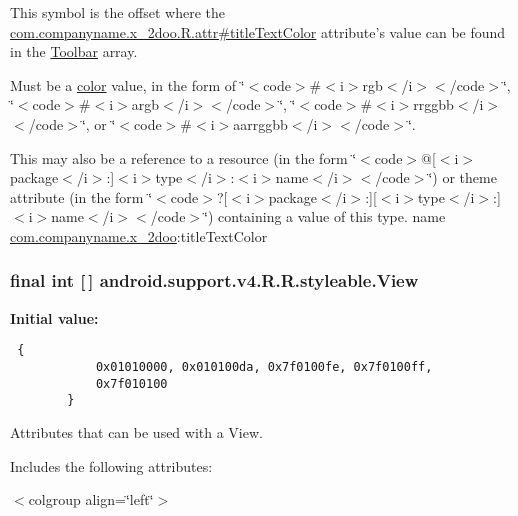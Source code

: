 This symbol is the offset where the \hyperlink{classcom_1_1companyname_1_1x__2doo_1_1_r_1_1attr_82d4d30477ffe7011f23274c9ec965a5}{com.companyname.x\_\-2doo.R.attr\#titleTextColor} attribute's value can be found in the \hyperlink{classandroid_1_1support_1_1v4_1_1_r_1_1styleable_0646d71cfbd4a8645c7d805b33e1c574}{Toolbar} array.

Must be a \hyperlink{classandroid_1_1support_1_1v4_1_1_r_1_1color}{color} value, in the form of \char`\"{}$<$code$>$\#$<$i$>$rgb$<$/i$>$$<$/code$>$\char`\"{}, \char`\"{}$<$code$>$\#$<$i$>$argb$<$/i$>$$<$/code$>$\char`\"{}, \char`\"{}$<$code$>$\#$<$i$>$rrggbb$<$/i$>$$<$/code$>$\char`\"{}, or \char`\"{}$<$code$>$\#$<$i$>$aarrggbb$<$/i$>$$<$/code$>$\char`\"{}. 

This may also be a reference to a resource (in the form \char`\"{}$<$code$>$@\mbox{[}$<$i$>$package$<$/i$>$:\mbox{]}$<$i$>$type$<$/i$>$:$<$i$>$name$<$/i$>$$<$/code$>$\char`\"{}) or theme attribute (in the form \char`\"{}$<$code$>$?\mbox{[}$<$i$>$package$<$/i$>$:\mbox{]}\mbox{[}$<$i$>$type$<$/i$>$:\mbox{]}$<$i$>$name$<$/i$>$$<$/code$>$\char`\"{}) containing a value of this type.  name \hyperlink{namespacecom_1_1companyname_1_1x__2doo}{com.companyname.x\_\-2doo}:titleTextColor \hypertarget{classandroid_1_1support_1_1v4_1_1_r_1_1styleable_b4963d78f1fa8984188692ee48ea20d2}{
\subsubsection[{View}]{\setlength{\rightskip}{0pt plus 5cm}final int \mbox{[}$\,$\mbox{]} android.support.v4.R.R.styleable.View}}
\label{classandroid_1_1support_1_1v4_1_1_r_1_1styleable_b4963d78f1fa8984188692ee48ea20d2}


\textbf{Initial value:}

\begin{Code}\begin{verbatim} {
            0x01010000, 0x010100da, 0x7f0100fe, 0x7f0100ff,
            0x7f010100
        }
\end{verbatim}
\end{Code}
Attributes that can be used with a View. 

Includes the following attributes: \begin{TabularC}{0}
\hline
\end{TabularC}
$<$colgroup align=\char`\"{}left\char`\"{}$>$ 

